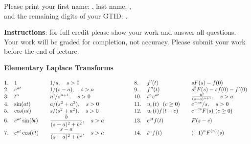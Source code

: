 \documentclass[11pt]{exam}
\begin{document}
    
\vspace*{-1cm}

\begin{center}
{\Large \TestName}
\end{center}
\newcommand{\ID}{Please print your first name: \framebox{\strut\hspace{4.2cm}}, last name: \framebox{\strut\hspace{4.2cm}}, \\[2pt] and the remaining digits of your GTID:  \framebox{\strut $9$}\framebox{\strut $0$}\framebox{\strut\hspace{0.19cm}}\framebox{\strut\hspace{0.19cm}}\framebox{\strut\hspace{0.19cm}}\framebox{\strut\hspace{0.19cm}}\framebox{\strut\hspace{0.19cm}}\framebox{\strut\hspace{0.19cm}}\framebox{\strut\hspace{0.19cm}}.}

\ID

\vspace{6pt}
\textbf{Instructions}: for full credit please show your work and answer all questions. Your work will be graded for completion, not accuracy. Please submit your work before the end of lecture. 
\def\dm{\displaystyle}

\begin{center}
    {\bf Elementary Laplace Transforms}\\[0pt]
\end{center}
$
\hspace*{-.5em}
\begin{array}{lllllll}
 1.  & 1 \quad  & 1/s,\quad s>0 & \qquad  \ \quad & 8.  & f'(t) \  \quad  &  sF(s) - f(0)\\[0ex]
 2.  & e^{at} \quad  & 1/(s-a),\quad s>a  & \qquad  \ \quad & 9.  & f''(t) \  \quad   & s^2F(s) - sf(0) - f'(0) \\[0ex]
 3.  & t^n  \quad  & n!/s^{n+1},\quad s>0 & \qquad  \ \quad & 10.  & t^n e^{at}\  \quad  & \frac{n!}{(s-a)^{n+1}},\quad s>a\\[0ex] 
 4.  & \sin(at) \quad  & a/(s^2+a^2),\quad s>0  & \qquad  \ \quad & 11. & u_c(t)\ \ (c\ge 0) \quad  & e^{-cs}/s,\quad s>0 \\[0ex]
 5.  & \cos(at) \quad  & s/(s^2+a^2),\quad s>0  & \qquad  \ \quad & 12.  & u_c(t)f(t-c)\  \quad  & \dm e^{-cs} F(s) \ (c\ge 0) \\[0ex] 
 6.  & e^{at}\sin(bt) \quad  & \dm\frac{b}{(s-a)^2+b^2},\quad s>a  & \qquad  \ \quad & 13.  & e^{ct}f(t) \quad  & \dm F(s-c) \\[0ex] 
 7.  & e^{at}\cos(bt) \quad  & \dm\frac{s-a}{(s-a)^2+b^2},\quad s>a & \qquad  \ \quad & 14.  & t^n f(t) \quad  & \dm (-1)^n F^{(n)}(s)  
\end{array} 
$
\end{document}
